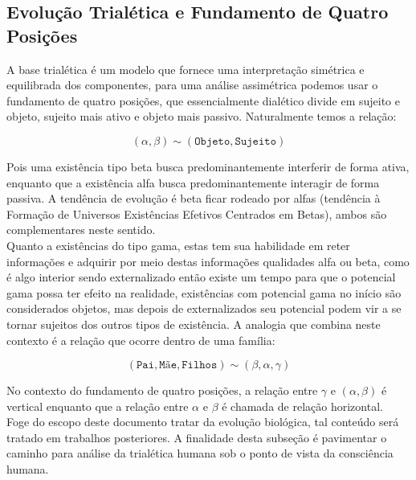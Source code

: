 \documentclass[10pt,a4paper]{report}
\begin{document}


\subsection{Evolução Trialética e Fundamento de Quatro Posições}

\hspace{\baselineskip}

A base trialética é um modelo que fornece uma interpretação simétrica e equilibrada dos componentes, para uma análise assimétrica podemos usar o fundamento de quatro posições, que essencialmente dialético divide em sujeito e objeto, sujeito mais ativo e objeto mais passivo. Naturalmente temos a relação:

$$ (\alpha, \beta) \sim (\texttt{Objeto}, \texttt{Sujeito}) $$

Pois uma existência tipo beta busca predominantemente interferir de forma ativa, enquanto que a existência alfa busca predominantemente interagir de forma passiva. A tendência de evolução é beta ficar rodeado por alfas (tendência à Formação de Universos Existências Efetivos Centrados em Betas), ambos são complementares neste sentido.\\

Quanto a existências do tipo gama, estas tem sua habilidade em reter informações e adquirir por meio destas informações qualidades alfa ou beta, como é algo interior sendo externalizado então existe um tempo para que o potencial gama possa ter efeito na realidade, existências com potencial gama no início são considerados objetos, mas depois de externalizados seu potencial podem vir a se tornar sujeitos dos outros tipos de existência. A analogia que combina neste contexto é a relação que ocorre dentro de uma família:

$$ (\texttt{Pai}, \texttt{Mãe}, \texttt{Filhos}) \sim (\beta, \alpha, \gamma) $$

No contexto do fundamento de quatro posições, a relação entre $\gamma$ e $(\alpha, \beta)$ é vertical enquanto que a relação entre $\alpha$ e $\beta$ é chamada de relação horizontal.\\

Foge do escopo deste documento tratar da evolução biológica, tal conteúdo será tratado em trabalhos posteriores. A finalidade desta subseção é pavimentar o caminho para análise da trialética humana sob o ponto de vista da consciência humana.
\end{document}
